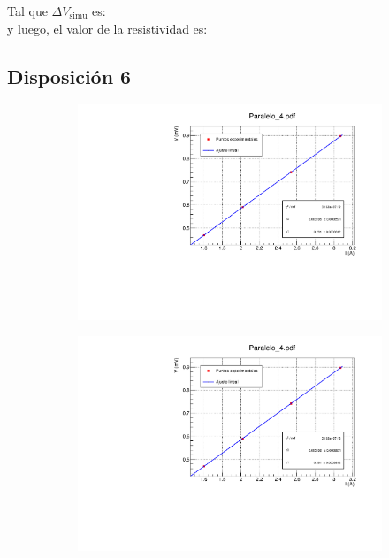 \documentclass[11pt]{article}
\newcommand{\simu}{\text{simu}}
\begin{document}
Tal que $\Delta V_{\simu}$ es: \\[1em]

y luego, el valor de la resistividad es:
\subsection{Disposición 6}

\begin{figure}[h!]\centering
	\begin{subfigure}[b]{0.49\textwidth}
		\includegraphics[width=1.05\linewidth]{Programas/Paralelo_4.pdf}
	\end{subfigure} \hfill
	\begin{subfigure}[b]{0.49\textwidth}
		\includegraphics[width=1.05\linewidth]{Programas/Paralelo_4.pdf}
	\end{subfigure}
\end{figure}
	
\end{document}
